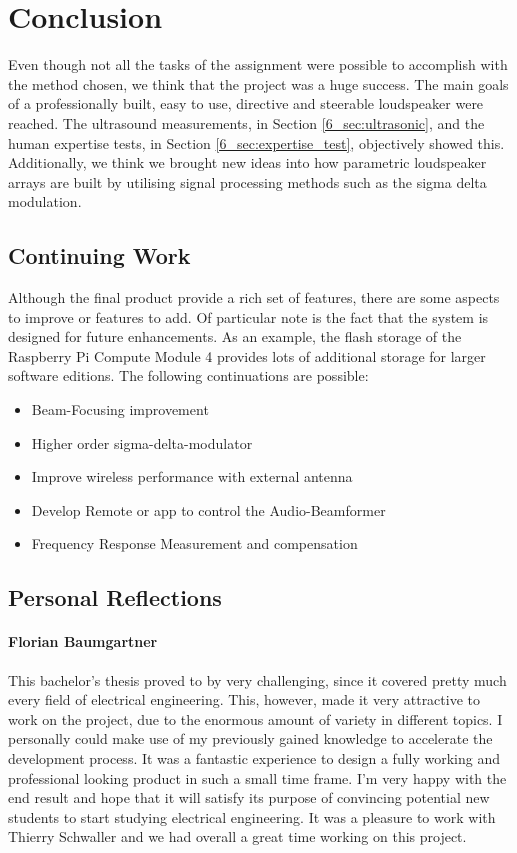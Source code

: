 \chapter{Conclusion}
Even though not all the tasks of the assignment were possible to accomplish with the method chosen, we think that the project was a huge success. The main goals of a professionally built, easy to use, directive and steerable loudspeaker were reached. The ultrasound measurements, in Section \ref{6_sec:ultrasonic}, and the human expertise tests, in Section \ref{6_sec:expertise_test}, objectively showed this. Additionally, we think we brought new ideas into how parametric loudspeaker arrays are built by utilising signal processing methods such as the sigma delta modulation.     
\section{Continuing Work}
Although the final product provide a rich set of features, there are some aspects to improve or features to add. Of particular note is the fact that the system is designed for future enhancements. As an example, the flash storage of the Raspberry Pi Compute Module 4 provides lots of additional storage for larger software editions. The following continuations are possible:

\bigskip
\begin{itemize}
		\item Beam-Focusing improvement
		\item Higher order sigma-delta-modulator
		\item Improve wireless performance with external antenna
		\item Develop Remote or app to control the Audio-Beamformer
		\item Frequency Response Measurement and compensation 
\end{itemize}
\newpage

\section{Personal Reflections}
\subsubsection{Florian Baumgartner}
This bachelor's thesis proved to by very challenging, since it covered pretty much every field of electrical engineering. This, however, made it very attractive to work on the project, due to the enormous amount of variety in different topics. I personally could make use of my previously gained knowledge to accelerate the development process. It was a fantastic experience to design a fully working and professional looking product in such a small time frame. I'm very happy with the end result and hope that it will satisfy its purpose of convincing potential new students to start studying electrical engineering. It was a pleasure to work with Thierry Schwaller and we had overall a great time working on this project.

